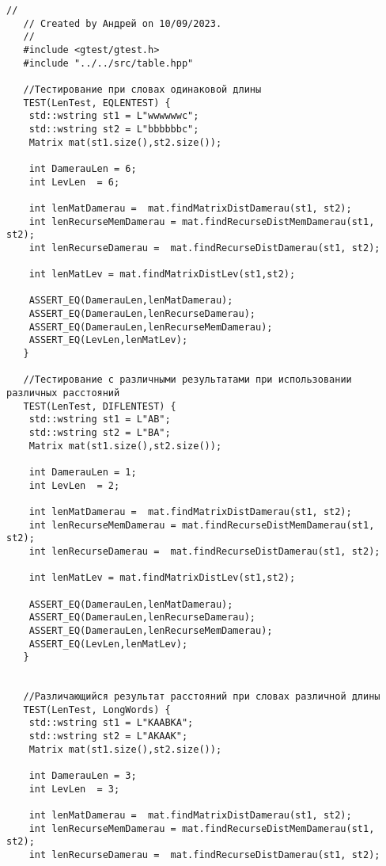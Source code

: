 \begin{lstlisting}[label=lst:unit_tests, caption=Модульные тесты]
   //
   // Created by Андрей on 10/09/2023.
   //
   #include <gtest/gtest.h>
   #include "../../src/table.hpp"
   
   //Тестирование при словах одинаковой длины
   TEST(LenTest, EQLENTEST) {
   	std::wstring st1 = L"wwwwwwc";
   	std::wstring st2 = L"bbbbbbc";
   	Matrix mat(st1.size(),st2.size());
   	
   	int DamerauLen = 6;
   	int LevLen  = 6;
   	
   	int lenMatDamerau =  mat.findMatrixDistDamerau(st1, st2);
   	int lenRecurseMemDamerau = mat.findRecurseDistMemDamerau(st1, st2);
   	int lenRecurseDamerau =  mat.findRecurseDistDamerau(st1, st2);
   	
   	int lenMatLev = mat.findMatrixDistLev(st1,st2);
   	
   	ASSERT_EQ(DamerauLen,lenMatDamerau);
   	ASSERT_EQ(DamerauLen,lenRecurseDamerau);
   	ASSERT_EQ(DamerauLen,lenRecurseMemDamerau);
   	ASSERT_EQ(LevLen,lenMatLev);
   }
   
   //Тестирование с различными результатами при использовании различных расстояний
   TEST(LenTest, DIFLENTEST) {
   	std::wstring st1 = L"AB";
   	std::wstring st2 = L"BA";
   	Matrix mat(st1.size(),st2.size());
   	
   	int DamerauLen = 1;
   	int LevLen  = 2;
   	
   	int lenMatDamerau =  mat.findMatrixDistDamerau(st1, st2);
   	int lenRecurseMemDamerau = mat.findRecurseDistMemDamerau(st1, st2);
   	int lenRecurseDamerau =  mat.findRecurseDistDamerau(st1, st2);
   	
   	int lenMatLev = mat.findMatrixDistLev(st1,st2);
   	
   	ASSERT_EQ(DamerauLen,lenMatDamerau);
   	ASSERT_EQ(DamerauLen,lenRecurseDamerau);
   	ASSERT_EQ(DamerauLen,lenRecurseMemDamerau);
   	ASSERT_EQ(LevLen,lenMatLev);
   }
   
   
   //Различающийся результат расстояний при словах различной длины
   TEST(LenTest, LongWords) {
   	std::wstring st1 = L"KAABKA";
   	std::wstring st2 = L"AKAAK";
   	Matrix mat(st1.size(),st2.size());
   	
   	int DamerauLen = 3;
   	int LevLen  = 3;
   	
   	int lenMatDamerau =  mat.findMatrixDistDamerau(st1, st2);
   	int lenRecurseMemDamerau = mat.findRecurseDistMemDamerau(st1, st2);
   	int lenRecurseDamerau =  mat.findRecurseDistDamerau(st1, st2);
   	

\end{lstlisting}
